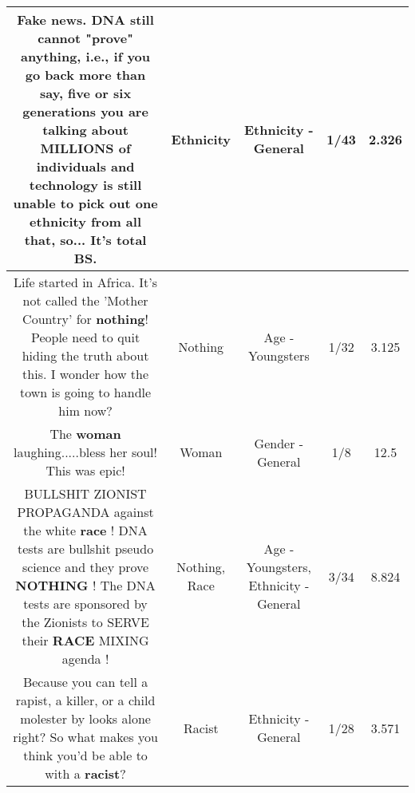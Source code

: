\documentclass[11pt]{article}
\newlength\mylength
\begin{document}
\begin{center}
\begin{longtable}{|C{.65\mylength}|C{.30\mylength}|C{.12\mylength}|C{.12\mylength}|C{.12\mylength}|}
  \small Fake news.  DNA still cannot "prove" anything, i.e., if you go back more than say, five or six generations you are talking about MILLIONS of individuals and technology is still unable to pick out one \textbf{ethnicity} from all that, so...  It's total BS.\normalsize   & Ethnicity & Ethnicity - General & 1/43 & 2.326 \\  \hline
  \small Life started in Africa. It's not called the 'Mother Country' for \textbf{nothing}! People need to quit hiding the truth about this. I wonder how the town is going to handle him now?\normalsize   & Nothing & Age - Youngsters & 1/32 & 3.125 \\  \hline
  \small The \textbf{woman} laughing.....bless her soul! This was epic!\normalsize   & Woman & Gender - General & 1/8 & 12.5 \\  \hline
  \small BULLSHIT  ZIONIST PROPAGANDA against the white \textbf{race} ! DNA tests are bullshit pseudo science and they prove \textbf{NOTHING} ! The DNA tests are sponsored by the Zionists to SERVE their \textbf{RACE} MIXING agenda !\normalsize   & Nothing, Race & Age - Youngsters, Ethnicity - General & 3/34 & 8.824 \\  \hline
  \small Because you can tell a rapist, a killer, or a child molester by looks alone right? So what makes you think you'd be able to with a \textbf{racist}?\normalsize   & Racist & Ethnicity - General & 1/28 & 3.571 \\  \hline

\end{longtable}
\end{center}
\end{document}
